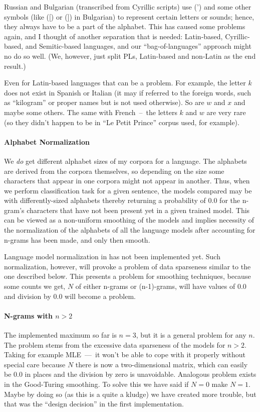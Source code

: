 Russian and Bulgarian (transcribed from Cyrillic scripts) use
(') and some other symbols (like ([) or (]) in Bulgarian) to represent
certain letters or sounds; hence, they always have to be a part of the
alphabet.
This has caused some problems again, and I thought of another separation that is
needed: Latin-based, Cyrillic-based, and Semitic-based languages,
and our ``bag-of-languages'' approach might no do so well. (We, however, just split
PLs, Latin-based and non-Latin as the end result.)

Even for Latin-based languages that can be a problem. For example, the
letter $k$ does not exist in Spanish or Italian (it may if referred to
the foreign words, such as ``kilogram'' or proper names but is not used otherwise).
So are $w$ and $x$ and maybe some others. The same
with French~--~the letters $k$ and $w$ are very rare (so they didn't happen to be in ``Le Petit
Prince'' corpus used, for example).

\paragraph{Alphabet Normalization}

We {\em do} get different alphabet sizes
of my corpora for a language. The alphabets are derived from the corpora
themselves, so depending on the size some characters that appear in
one corpora might not appear in another. Thus, when we perform classification
task for a given sentence, the models compared may be with differently-sized
alphabets thereby returning a probability of 0.0 for the n-gram's characters that
have not been present yet in a given trained model. This can
be viewed as a non-uniform smoothing of the models and implies necessity
of the normalization of the alphabets of all the language models after
accounting for n-grams has been made, and only then smooth.

Language model normalization in has not been implemented yet. Such normalization, however, will
provoke a problem of data sparseness similar to the one described below.
This presents a problem for smoothing techniques, because some counts
we get, $N$ of either n-grams or (n-1)-grams, will have values of 0.0 and
division by 0.0 will become a problem.

\paragraph{N-grams with $n > 2$}

The implemented maximum so far is $n = 3$, but it is a general problem for any $n$.
The problem stems from
the excessive data sparseness of the models for $n > 2$. Taking for
example MLE~---~it won't be able to cope with it properly without
special care because $N$ there is now a two-dimensional matrix,
which can easily be 0.0 in places and the division by zero is unavoidable.
Analogous problem exists in the Good-Turing smoothing.
To solve this we have said if $N = 0$ make $N=1$. Maybe by doing
so (as this is a quite a kludge) we have created more trouble,
but that was the ``design decision'' in the first implementation.

